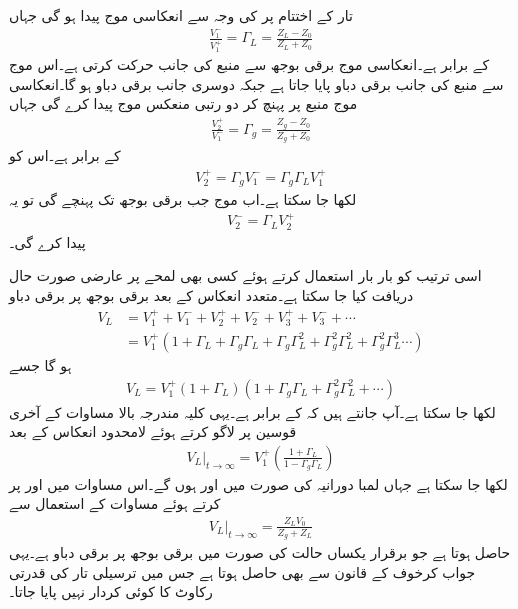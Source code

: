 تار کے اختتام پر  کی وجہ سے انعکاسی موج  پیدا ہو گی جہاں
\begin{align*}
\frac{V_1^-}{V_1^+}=\Gamma_L=\frac{Z_L-Z_0}{Z_L+Z_0}
\end{align*}
 کے برابر ہے۔انعکاسی موج برقی بوجھ سے منبع کی جانب حرکت کرتی ہے۔اس موج سے منبع کی جانب  برقی دباو پایا جاتا ہے جبکہ دوسری جانب  برقی دباو ہو گا۔انعکاسی موج  منبع پر پہنچ کر دو رتبی منعکس موج  پیدا کرے گی جہاں
\begin{align*}
\frac{V_2^+}{V_1^-}=\Gamma_g=\frac{Z_g-Z_0}{Z_g+Z_0}
\end{align*}
کے برابر ہے۔اس کو
\begin{align*}
V_2^+=\Gamma_g V_1^-=\Gamma_g \Gamma_L V_1^+
\end{align*}
لکھا جا سکتا ہے۔اب  موج جب برقی بوجھ تک پہنچے گی تو یہ 
\begin{align*}
V_2^-=\Gamma_L V_2^+
\end{align*}
 پیدا کرے گی۔

اسی ترتیب کو بار بار استعمال کرتے ہوئے کسی بھی لمحے پر عارضی صورت حال دریافت کیا جا سکتا ہے۔متعدد انعکاس کے بعد برقی بوجھ پر برقی دباو
\begin{align*}
V_L&=V_1^+ + V_1^- + V_2^+ + V_2^- + V_3^+ + V_3^- + \cdots\\
&=V_1^+ (1+\Gamma_L + \Gamma_g \Gamma_L + \Gamma_g \Gamma_L ^2+\Gamma_g^2 \Gamma_L^2+\Gamma_g^2 \Gamma_L^3\cdots )
\end{align*}
ہو گا جسے
\begin{align*}
V_L=V_1^+(1+\Gamma_L)(1+\Gamma_g \Gamma_L+\Gamma_g^2 \Gamma_L^2+\cdots)
\end{align*}
لکھا جا سکتا ہے۔آپ جانتے ہیں کہ  کے برابر ہے۔یہی کلیہ مندرجہ بالا مساوات کے آخری قوسین پر لاگو کرتے ہوئے  لامحدود انعکاس کے بعد
\begin{align*}
\left. V_L \right|_{t \to \infty}=V_1^+\left(\frac{1+\Gamma_L}{1-\Gamma_g \Gamma_L}\right) 
\end{align*}
لکھا جا سکتا ہے جہاں لمبا دورانیہ   کی صورت میں   اور  ہوں گے۔اس مساوات میں  اور  پر کرتے ہوئے مساوات  کے استعمال  سے
\begin{align*}
\left. V_L \right|_{t \to \infty}=\frac{Z_L V_0}{Z_g+Z_L}
\end{align*}
حاصل ہوتا ہے جو برقرار یکساں حالت کی صورت میں برقی بوجھ پر برقی دباو ہے۔یہی جواب کرخوف کے قانون سے بھی حاصل ہوتا ہے جس میں ترسیلی تار کی قدرتی رکاوٹ کا کوئی کردار نہیں پایا جاتا۔

